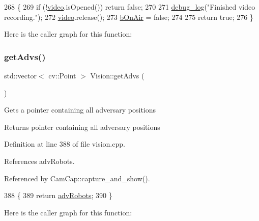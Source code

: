 \begin{DoxyCode}
268                          \{
269     \textcolor{keywordflow}{if} (!\hyperlink{class_vision_a65230f76c9af171a0a9faba81b57f3d5}{video}.isOpened()) \textcolor{keywordflow}{return} \textcolor{keyword}{false};
270 
271     \hyperlink{debug_8hpp_afde3f42696113719c9ae35507125ee6e}{debug\_log}(\textcolor{stringliteral}{"Finished video recording."});
272     \hyperlink{class_vision_a65230f76c9af171a0a9faba81b57f3d5}{video}.release();
273     \hyperlink{class_vision_a1eb56f5e3433ca3dce53fe315b845979}{bOnAir} = \textcolor{keyword}{false};
274 
275     \textcolor{keywordflow}{return} \textcolor{keyword}{true};
276 \}
\end{DoxyCode}
Here is the caller graph for this function\+:
\mbox{\label{class_vision_ade08a555c6bcba89ee6a60be24f95c5b}} 
\subsubsection{\texorpdfstring{get\+Advs()}{getAdvs()}}
{\footnotesize\ttfamily std\+::vector$<$ cv\+::\+Point $>$ Vision\+::get\+Advs (\begin{DoxyParamCaption}{ }\end{DoxyParamCaption})}

Gets a pointer containing all adversary positions \begin{DoxyReturn}{Returns}
pointer containing all adversary positions 
\end{DoxyReturn}


Definition at line 388 of file vision.\+cpp.



References adv\+Robots.



Referenced by Cam\+Cap\+::capture\+\_\+and\+\_\+show().


\begin{DoxyCode}
388                                    \{
389     \textcolor{keywordflow}{return} \hyperlink{class_vision_ac6fb7fc6bde1436ef63c255858d690a4}{advRobots};
390 \}
\end{DoxyCode}
Here is the caller graph for this function\+:
\mbox{\label{class_vision_a563041d47d11e0912227c3ce87dcc22e}} 
